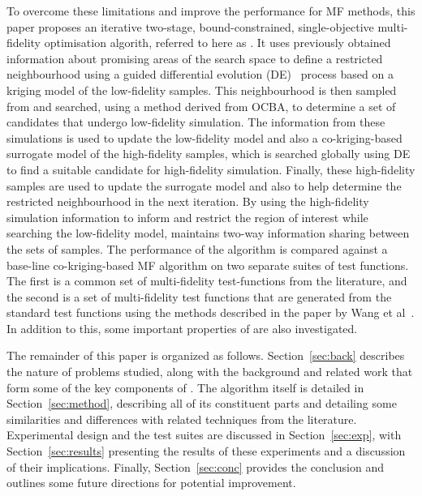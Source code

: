 To overcome these limitations and improve the performance for MF methods, this paper proposes an iterative two-stage, bound-constrained, single-objective multi-fidelity optimisation algorith, referred to here as \AlgName{}. It uses previously obtained information about promising areas of the search space to define a restricted neighbourhood using a guided differential evolution (DE)~\cite{storn1997differential} process based on a kriging model of the low-fidelity samples. This neighbourhood is then sampled from and searched, using a method derived from OCBA, to determine a set of candidates that undergo low-fidelity simulation. The information from these simulations is used to update the low-fidelity model and also a co-kriging-based surrogate model of the high-fidelity samples, which is searched globally using DE to find a suitable candidate for high-fidelity simulation. Finally, these high-fidelity samples are used to update the surrogate model and also to help determine the restricted neighbourhood in the next iteration. By using the high-fidelity simulation information to inform and restrict the region of interest while searching the low-fidelity model, \AlgName{} maintains two-way information sharing between the sets of samples. The performance of the \AlgName{} algorithm is compared against a base-line co-kriging-based MF algorithm on two separate suites of test functions. The first is a common set of multi-fidelity test-functions from the literature, and the second is a set of multi-fidelity test functions that are generated from the standard test functions using the methods described in the paper by Wang et al~\cite{wang2017generic}. In addition to this, some important properties of \AlgName{} are also investigated.

The remainder of this paper is organized as follows. Section~\ref{sec:back} describes the nature of problems studied, along with the background and related work that form some of the key components of \AlgName{}. The algorithm itself is detailed in Section~\ref{sec:method}, describing all of its constituent parts and detailing some similarities and differences with related techniques from the literature. Experimental design and the test suites are discussed in Section~\ref{sec:exp}, with Section~\ref{sec:results} presenting the results of these experiments and a discussion of their implications. Finally, Section~\ref{sec:conc} provides the conclusion and outlines some future directions for potential improvement.
